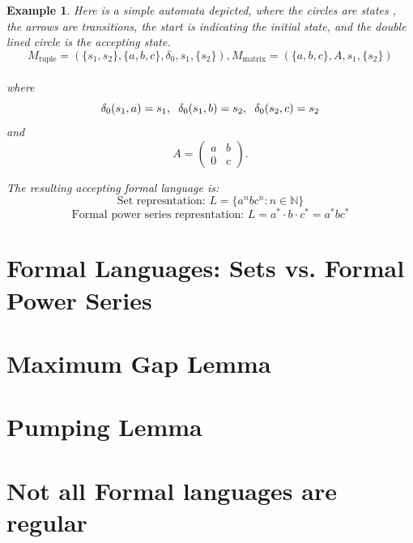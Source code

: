 \documentclass[12pt,letterpaper]{article}
\newtheorem{example}{Example}[section]
\begin{document}
\begin{example}
  Here is a simple automata depicted, where the circles are states
  , the arrows are transitions, the start is indicating the initial 
  state, and the double lined circle is the accepting state.
  \[ 
    M_\text{tuple} = (\{s_1, s_2\}, \{a,b,c\}, \delta_0, s_1, \{s_2\}),
    M_\text{matrix} = (\{a,b,c\}, A, s_1, \{ s_2 \})
  \]\\
  where
  \[
    \delta_0(s_1, a) = s_1, \hspace{0.2cm} 
    \delta_0(s_1, b) = s_2, \hspace{0.2cm} \delta_0(s_2,c) = s_2
  \]
  and
  \[ 
    A = 
    \begin{pmatrix}
      a & b \\
      0 & c 
    \end{pmatrix}.
  \]
  \begin{center}
  \end{center}
  The resulting accepting formal language is:
  \[ \text{Set represntation: } L = \{a^nbc^n : n \in \mathbb{N}\}\]
  \[
    \text{Formal power series represntation: } L = a^*\cdot b\cdot c^* 
  = a^*bc^*
\]
\end{example}
\section{Formal Languages: Sets vs. Formal Power Series}
\section{Maximum Gap Lemma}
\section{Pumping Lemma}
\section{Not all Formal languages are regular}
\end{document}
